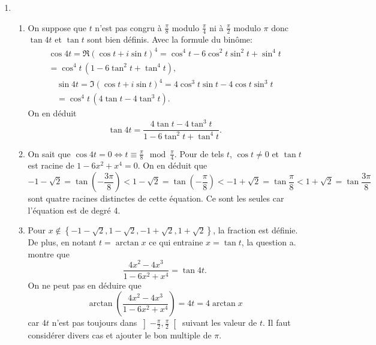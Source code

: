 \begin{enumerate}
\item
\begin{enumerate}
  \item On suppose que $t$ n'est pas congru {\`a} $\frac{\pi }{8}$ modulo $\frac{\pi }{4}$ ni {\`a} $\frac{\pi }{2}$ modulo $\pi $ donc $\tan 4t$ et $\tan t$
sont bien d{\'e}finis. Avec la formule du binôme:
\begin{multline*}
\cos 4t = \Re (\cos t+i\sin t)^{4} = \cos ^{4}t-6\cos^{2}t\sin^{2}t+\sin ^{4}t \\
 = \cos ^{4}t\,\left(1-6\tan ^{2}t+\tan^{4}t\right),
\end{multline*}
\begin{multline*}
\sin 4t = \Im (\cos t+i\sin t)^{4} = 4\cos ^{3}t\sin t-4\cos t\sin^{3}t\\
 = \cos ^{4}t\,\left(4\tan t-4\tan ^{3}t\right).
\end{multline*}
On en d{\'e}duit
\[
\tan 4t=\frac{4\tan t-4\tan ^{3}t}{1-6\tan ^{2}t+\tan ^{4}t}.
\]

  \item On sait que $\cos 4t = 0 \Leftrightarrow t \equiv \frac{\pi}{8} \mod \frac{\pi}{4}$. Pour de tels $t$, $\cos t \neq 0$ et $\tan t$ est racine de $1-6x^2 + x^4=0$. On en déduit que 
\[
  -1-\sqrt{2} = \tan(-\frac{3\pi}{8}) < 1 - \sqrt{2} = \tan(-\frac{\pi}{8}) < - 1 + \sqrt{2} = \tan\frac{\pi}{8} <  1 + \sqrt{2} = \tan\frac{3\pi}{8} 
\]
sont quatre racines distinctes de cette équation. Ce sont les seules car l'équation est de degré 4. 
  
  \item Pour $x\notin \left\{ -1 - \sqrt{2}, 1 - \sqrt{2}, -1 + \sqrt{2}, 1+\sqrt{2}\right\}$, la fraction est définie. De plus, en notant $t=\arctan x$ ce qui entraine $x=\tan t$, la question a. montre que
\[
\frac{4x^{2}-4x^{3}}{1-6x^{2}+x^{4}} = \tan 4t.
\]
On ne peut pas en déduire que 
\[
\arctan \left(\frac{4x^{2}-4x^{3}}{1-6x^{2}+x^{4}}\right) = 4t = 4\arctan x
\]
car $4t$ n'est pas toujours dans $\left] -\frac{\pi}{2}, \frac{\pi}{2} \right[$ suivant les valeur de $t$. Il faut considérer divers cas et ajouter le bon multiple de $\pi$.


\end{enumerate}
\end{enumerate}
